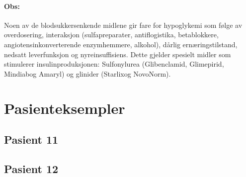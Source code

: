 					\paragraph{Obs:\\}Noen av de blodsukkersenkende midlene gir fare for hypoglykemi som følge av overdosering, interaksjon (sulfapreparater, antiflogistika, betablokkere, angiotensinkonverterende enzymhemmere, alkohol), dårlig ernæringstilstand, nedsatt leverfunksjon og nyreinsuffisiens. Dette gjelder spesielt midler som stimulerer insulinproduksjonen: Sulfonylurea (Glibenclamid\textregistered, Glimepirid\textregistered, Mindiab\textregistered og Amaryl\textregistered) og glinider (Starlix\textregistered og NovoNorm\textregistered).
		\section{Pasienteksempler}
			\subsection{Pasient 11}
			\subsection{Pasient 12}